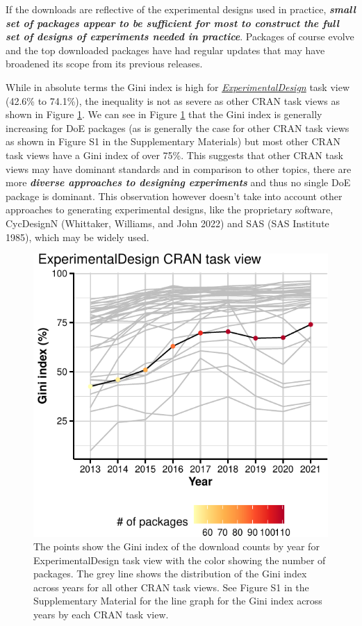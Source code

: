 \documentclass{article}
\begin{document}
If the downloads are reflective of the experimental designs used in
practice, \textbf{\emph{small set of packages appear to be sufficient
for most to construct the full set of designs of experiments needed in
practice}}. Packages of course evolve and the top downloaded packages
have had regular updates that may have broadened its scope from its
previous releases.

While in absolute terms the Gini index is high for
\href{http://CRAN.R-project.org/view=ExperimentalDesign}{\emph{ExperimentalDesign}}
task view (42.6\% to 74.1\%), the inequality is not as severe as other
CRAN task views as shown in Figure \ref{fig:fig-gini-all-ctvs}. We can
see in Figure \ref{fig:fig-gini-all-ctvs} that the Gini index is
generally increasing for DoE packages (as is generally the case for
other CRAN task views as shown in Figure S1 in the Supplementary
Materials) but most other CRAN task views have a Gini index of over
75\%. This suggests that other CRAN task views may have dominant
standards and in comparison to other topics, there are more
\textbf{\emph{diverse approaches to designing experiments}} and thus no
single DoE package is dominant. This observation however doesn't take
into account other approaches to generating experimental designs, like
the proprietary software, CycDesignN (Whittaker, Williams, and John
2022) and SAS (SAS Institute 1985), which may be widely used.

\begin{figure}[htbp]

{\centering \includegraphics{figures/fig-gini-all-ctvs-1} 

}

\caption{The points show the Gini index of the download counts by year for ExperimentalDesign task view with the color showing the number of packages. The grey line shows the distribution of the Gini index across years for all other CRAN task views. See Figure S1 in the Supplementary Material for the line graph for the Gini index across years by each CRAN task view.}\label{fig:fig-gini-all-ctvs}
\end{figure}
\end{document}
